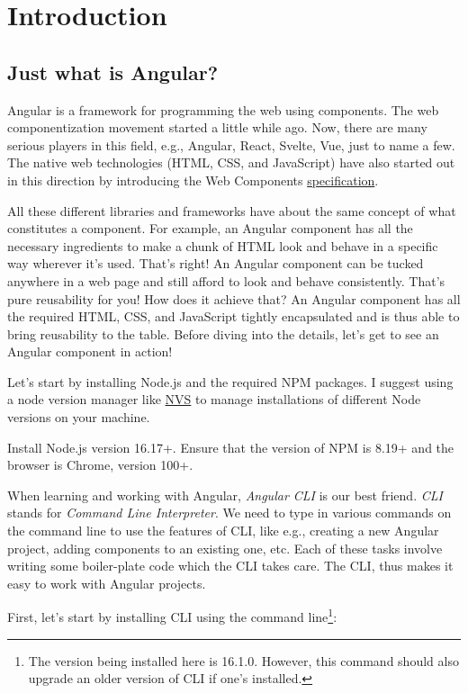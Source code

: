 \documentclass{report}
\begin{document}
	\chapter{Introduction}
	\section{Just what is Angular?}
Angular is a framework for programming the web using components. The web componentization movement started a little while ago. Now, there are many serious players in this field, e.g., Angular, React, Svelte, Vue, just to name a few. The native web technologies (HTML, CSS, and JavaScript) have also started out in this direction by introducing the Web Components \href{https://www.webcomponents.org/specs}{specification}.

All these different libraries and frameworks have about the same concept of what constitutes a component. For example, an Angular component has all the necessary ingredients to make a chunk of HTML look and behave in a specific way wherever it's used. That's right! An Angular component can be tucked anywhere in a web page and still afford to look and behave consistently. That's pure reusability for you! How does it achieve that? An Angular component has all the required HTML, CSS, and JavaScript tightly encapsulated and is thus able to bring reusability to the table. Before diving into the details, let's get to see an Angular component in action!

Let's start by installing Node.js and the required NPM packages. I suggest using a node version manager like \href{https://github.com/jasongin/nvs}{NVS} to manage installations of different Node versions on your machine.

Install Node.js version 16.17+. Ensure that the version of NPM is 8.19+ and the browser is Chrome, version 100+.

When learning and working with Angular, \textsl{Angular CLI} is our best friend. \textsl{CLI} stands for \textsl{Command Line Interpreter}. We need to type in various commands on the command line to use the features of CLI, like e.g., creating a new Angular project, adding components to an existing one, etc. Each of these tasks involve writing some boiler-plate code which the CLI takes care. The CLI, thus makes it easy to work with Angular projects.

First, let's start by installing CLI using the command line\footnote{The version being installed here is 16.1.0. However, this command should also upgrade an older version of CLI if one's installed.}:
\end{document}
